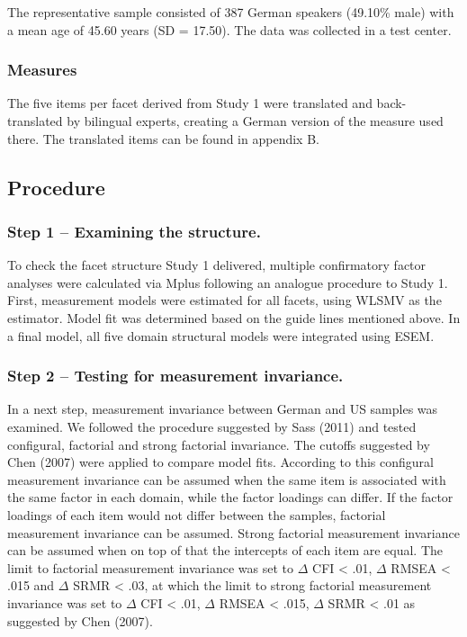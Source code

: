 \documentclass[,man,floatsintext]{apa6}
\begin{document}
The representative sample consisted of 387 German speakers (49.10\%
male) with a mean age of 45.60 years (SD = 17.50). The data was
collected in a test center.

\subsubsection{Measures}\label{measures-1}

The five items per facet derived from Study 1 were translated and
back-translated by bilingual experts, creating a German version of the
measure used there. The translated items can be found in appendix B.

\subsection{Procedure}\label{procedure-1}

\subsubsection{Step 1 -- Examining the
structure.}\label{step-1-examining-the-structure.}

To check the facet structure Study 1 delivered, multiple confirmatory
factor analyses were calculated via Mplus following an analogue
procedure to Study 1. First, measurement models were estimated for all
facets, using WLSMV as the estimator. Model fit was determined based on
the guide lines mentioned above. In a final model, all five domain
structural models were integrated using ESEM.

\subsubsection{Step 2 -- Testing for measurement
invariance.}\label{step-2-testing-for-measurement-invariance.}

In a next step, measurement invariance between German and US samples was
examined. We followed the procedure suggested by Sass (2011) and tested
configural, factorial and strong factorial invariance. The cutoffs
suggested by Chen (2007) were applied to compare model fits. According
to this configural measurement invariance can be assumed when the same
item is associated with the same factor in each domain, while the factor
loadings can differ. If the factor loadings of each item would not
differ between the samples, factorial measurement invariance can be
assumed. Strong factorial measurement invariance can be assumed when on
top of that the intercepts of each item are equal. The limit to
factorial measurement invariance was set to \(\Delta\) CFI \textless{}
.01, \(\Delta\) RMSEA \textless{} .015 and \(\Delta\) SRMR \textless{}
.03, at which the limit to strong factorial measurement invariance was
set to \(\Delta\) CFI \textless{} .01, \(\Delta\) RMSEA \textless{}
.015, \(\Delta\) SRMR \textless{} .01 as suggested by Chen (2007).
\end{document}
